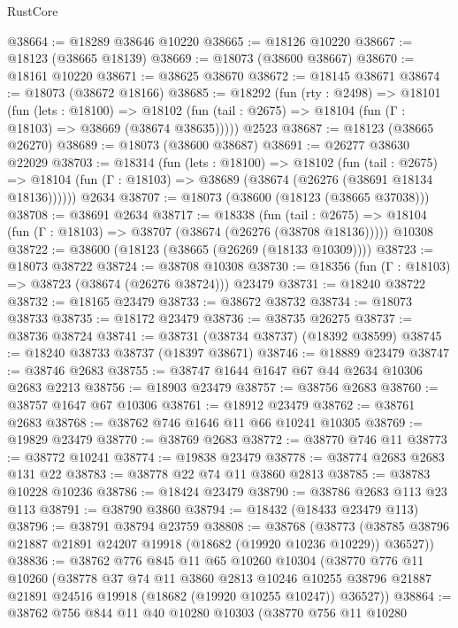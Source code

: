 \begin{lexlean}{RustCore}
\begin{coremodule}
@38664 := @18289 @38646 @10220
@38665 := @18126 @10220
@38667 := @18123 (@38665 @18139)
@38669 := @18073 (@38600 @38667)
@38670 := @18161 @10220
@38671 := @38625 @38670
@38672 := @18145 @38671
@38674 := @18073 (@38672 @18166)
@38685 := @18292
    (fun (rty : @2498) =>
    @18101
      (fun (lets : @18100) =>
      @18102 (fun (tail : @2675) => @18104 (fun (Γ : @18103) => @38669 (@38674 @38635)))))
    @2523
@38687 := @18123 (@38665 @26270)
@38689 := @18073 (@38600 @38687)
@38691 := @26277 @38630 @22029
@38703 := @18314
    (fun (lets : @18100) =>
    @18102
      (fun (tail : @2675) =>
      @18104 (fun (Γ : @18103) => @38689 (@38674 (@26276 (@38691 @18134 @18136))))))
    @2634
@38707 := @18073 (@38600 (@18123 (@38665 @37038)))
@38708 := @38691 @2634
@38717 := @18338
    (fun (tail : @2675) => @18104 (fun (Γ : @18103) => @38707 (@38674 (@26276 (@38708 @18136)))))
    @10308
@38722 := @38600 (@18123 (@38665 (@26269 (@18133 @10309))))
@38723 := @18073 @38722
@38724 := @38708 @10308
@38730 := @18356 (fun (Γ : @18103) => @38723 (@38674 (@26276 @38724))) @23479
@38731 := @18240 @38722
@38732 := @18165 @23479
@38733 := @38672 @38732
@38734 := @18073 @38733
@38735 := @18172 @23479
@38736 := @38735 @26275
@38737 := @38736 @38724
@38741 := @38731 (@38734 @38737) (@18392 @38599)
@38745 := @18240 @38733 @38737 (@18397 @38671)
@38746 := @18889 @23479
@38747 := @38746 @2683
@38755 := @38747 @1644 @1647 @67 @44 @2634 @10306 @2683 @2213
@38756 := @18903 @23479
@38757 := @38756 @2683
@38760 := @38757 @1647 @67 @10306
@38761 := @18912 @23479
@38762 := @38761 @2683
@38768 := @38762 @746 @1646 @11 @66 @10241 @10305
@38769 := @19829 @23479
@38770 := @38769 @2683
@38772 := @38770 @746 @11
@38773 := @38772 @10241
@38774 := @19838 @23479
@38778 := @38774 @2683 @2683 @131 @22
@38783 := @38778 @22 @74 @11 @3860 @2813
@38785 := @38783 @10228 @10236
@38786 := @18424 @23479
@38790 := @38786 @2683 @113 @23 @113
@38791 := @38790 @3860
@38794 := @18432 (@18433 @23479 @113)
@38796 := @38791 @38794 @23759
@38808 := @38768
    (@38773 (@38785 @38796 @21887 @21891 @24207 @19918 (@18682 (@19920 @10236 @10229)) @36527))
@38836 := @38762
    @776
    @845
    @11
    @65
    @10260
    @10304
    (@38770
      @776
      @11
      @10260
      (@38778
        @37
        @74
        @11
        @3860
        @2813
        @10246
        @10255
        @38796
        @21887
        @21891
        @24516
        @19918
        (@18682 (@19920 @10255 @10247))
        @36527))
@38864 := @38762
    @756
    @844
    @11
    @40
    @10280
    @10303
    (@38770
      @756
      @11
      @10280

\end{coremodule}
\end{lexlean}
